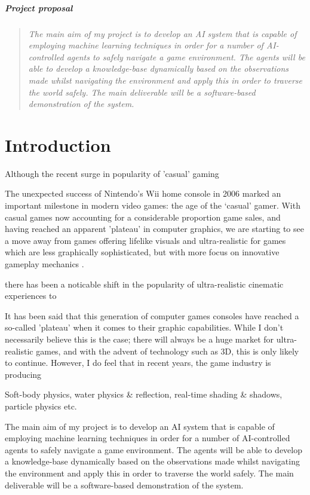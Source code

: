 \documentclass[a4paper,oneside]{report}
\begin{document}
%
%

\paragraph{Project proposal}

\begin{quotation}
\emph{The main aim of my project is to develop an AI system that is capable of employing machine learning techniques in order for a number of AI-controlled agents to safely navigate a game environment.
The agents will be able to develop a knowledge-base dynamically based on the observations made whilst navigating the environment and apply this in order to traverse the world safely.
The main deliverable will be a software-based demonstration of the system.}
\end{quotation}

\chapter{Introduction}
 
Although the recent surge in popularity of 'casual' gaming
 
The unexpected success of Nintendo's Wii home console in 2006 marked an important milestone in modern video games: the age of the `casual' gamer. With casual games now accounting for a considerable proportion game sales, and having reached an apparent 'plateau' in computer graphics, we are starting to see a move away from games offering lifelike visuals and ultra-realistic for games which are less graphically sophisticated, but with more focus on innovative gameplay mechanics \cite{Association:2011uq,Sheffield:2008fk}. 

there has been a noticable shift in the popularity of ultra-realistic cinematic experiences to  

It has been said that this generation of computer games consoles have reached a so-called 'plateau' when it comes to their graphic capabilities. While I don't necessarily believe this is the case; there will always be a huge market for ultra-realistic games, and with the advent of technology such as 3D, this is only likely to continue. However, I do feel that in recent years, the game industry is producing 

Soft-body physics, water physics \& reflection, real-time shading \& shadows, particle physics etc. 

The main aim of my project is to develop an AI system that is capable of employing machine learning techniques in order for a number of AI-controlled agents to safely navigate a game environment. The agents will be able to develop a knowledge-base dynamically based on the observations made whilst navigating the environment and apply this in order to traverse the world safely. The main deliverable will be a software-based demonstration of the system.
\end{document}
